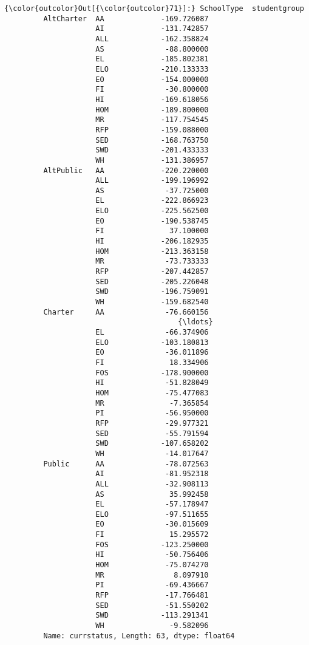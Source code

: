 \documentclass[11pt]{article}
\begin{document}
\begin{Verbatim}[commandchars=\\\{\}]
{\color{outcolor}Out[{\color{outcolor}71}]:} SchoolType  studentgroup
         AltCharter  AA             -169.726087
                     AI             -131.742857
                     ALL            -162.358824
                     AS              -88.800000
                     EL             -185.802381
                     ELO            -210.133333
                     EO             -154.000000
                     FI              -30.800000
                     HI             -169.618056
                     HOM            -189.800000
                     MR             -117.754545
                     RFP            -159.088000
                     SED            -168.763750
                     SWD            -201.433333
                     WH             -131.386957
         AltPublic   AA             -220.220000
                     ALL            -199.196992
                     AS              -37.725000
                     EL             -222.866923
                     ELO            -225.562500
                     EO             -190.538745
                     FI               37.100000
                     HI             -206.182935
                     HOM            -213.363158
                     MR              -73.733333
                     RFP            -207.442857
                     SED            -205.226048
                     SWD            -196.759091
                     WH             -159.682540
         Charter     AA              -76.660156
                                        {\ldots}    
                     EL              -66.374906
                     ELO            -103.180813
                     EO              -36.011896
                     FI               18.334906
                     FOS            -178.900000
                     HI              -51.828049
                     HOM             -75.477083
                     MR               -7.365854
                     PI              -56.950000
                     RFP             -29.977321
                     SED             -55.791594
                     SWD            -107.658202
                     WH              -14.017647
         Public      AA              -78.072563
                     AI              -81.952318
                     ALL             -32.908113
                     AS               35.992458
                     EL              -57.178947
                     ELO             -97.511655
                     EO              -30.015609
                     FI               15.295572
                     FOS            -123.250000
                     HI              -50.756406
                     HOM             -75.074270
                     MR                8.097910
                     PI              -69.436667
                     RFP             -17.766481
                     SED             -51.550202
                     SWD            -113.291341
                     WH               -9.582096
         Name: currstatus, Length: 63, dtype: float64
\end{Verbatim}
            
\end{document}
